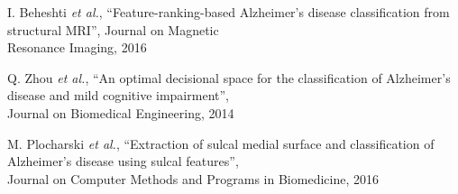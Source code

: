 \begin{frame}
	\cite{Beheshti16} I. Beheshti \emph{et al.}, ``Feature-ranking-based Alzheimer's disease
	classification from structural MRI'', Journal on Magnetic\\ \hspace{0.25cm} Resonance Imaging, 2016
	
	\cite{Zhou14} Q. Zhou \emph{et al.}, ``An optimal decisional space for the classification of 
	Alzheimer's disease and mild cognitive impairment'',\\ \hspace{0.25cm} Journal on Biomedical
	Engineering, 2014
	
	\cite{Plocharski16} M. Plocharski \emph{et al.}, ``Extraction of sulcal medial surface and
	classification of Alzheimer's disease using sulcal features'',\\ \hspace{0.25cm} Journal on
	Computer Methods and Programs in Biomedicine, 2016
\end{frame}


